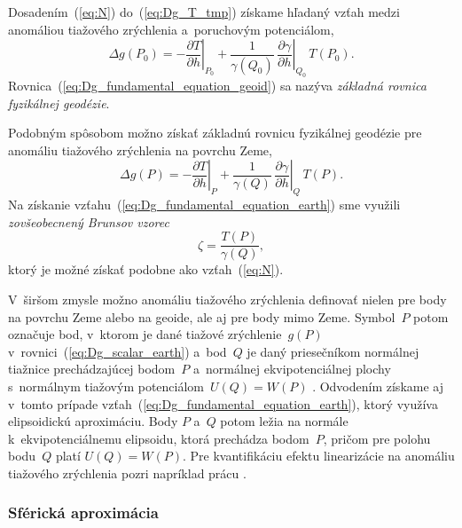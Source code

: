 \documentclass[a4paper, 12pt]{book}
\begin{document}
Dosadením~(\ref{eq:N}) do~(\ref{eq:Dg_T_tmp}) získame hľadaný vzťah medzi 
anomáliou tiažového zrýchlenia a~poruchovým potenciálom,
%
\begin{equation}
\label{eq:Dg_fundamental_equation_geoid}
\Delta g(P_0) = -\left.\frac{\partial T}{\partial h}\right|_{P_0} 
+ \frac{1}{\gamma(Q_0)} \, \left.\frac{\partial \gamma}{\partial 
h}\right|_{Q_0} \, T(P_0){.}
\end{equation}
%
Rovnica~(\ref{eq:Dg_fundamental_equation_geoid}) sa nazýva \emph{základná 
rovnica fyzikálnej geodézie}.

Podobným spôsobom možno získať základnú rovnicu fyzikálnej geodézie pre 
anomáliu tiažového zrýchlenia na povrchu Zeme,
%
\begin{equation}
\label{eq:Dg_fundamental_equation_earth}
\Delta g(P) = -\left.\frac{\partial T}{\partial h}\right|_{P} 
+ \frac{1}{\gamma(Q)} \, \left.\frac{\partial \gamma}{\partial h}\right|_{Q} \, 
T(P){.}
\end{equation}
%
Na získanie vzťahu~(\ref{eq:Dg_fundamental_equation_earth}) sme využili 
\emph{zovšeobecnený Brunsov vzorec}
%
\begin{equation}
\label{eq:zeta}
\zeta = \frac{T(P)}{\gamma(Q)}{,}
\end{equation}
%
ktorý je možné získať podobne ako vzťah~(\ref{eq:N}).

V~širšom zmysle možno anomáliu tiažového zrýchlenia definovať nielen pre body 
na povrchu Zeme alebo na geoide, ale aj pre body mimo Zeme.  Symbol~$P$ potom 
označuje bod, v~ktorom je dané tiažové zrýchlenie~$g(P)$ 
v~rovnici~(\ref{eq:Dg_scalar_earth}) a~bod~$Q$ je daný priesečníkom normálnej 
tiažnice prechádzajúcej bodom~$P$ a~normálnej ekvipotenciálnej plochy 
s~normálnym tiažovým potenciálom~$U(Q) = W(P)$ 
\parencite{MoritzPhysicalGeodesy}.  Odvodením získame aj v~tomto prípade 
vzťah~(\ref{eq:Dg_fundamental_equation_earth}), ktorý využíva elipsoidickú 
aproximáciu.  Body $P$ a~$Q$ potom ležia na normále k~ekvipotenciálnemu 
elipsoidu, ktorá prechádza bodom~$P$, pričom pre polohu bodu~$Q$ platí $U(Q) 
= W(P)$.  Pre kvantifikáciu efektu linearizácie na anomáliu tiažového 
zrýchlenia pozri napríklad prácu \textcite{Claessens2006}.

\subsubsection{Sférická aproximácia}
\end{document}
